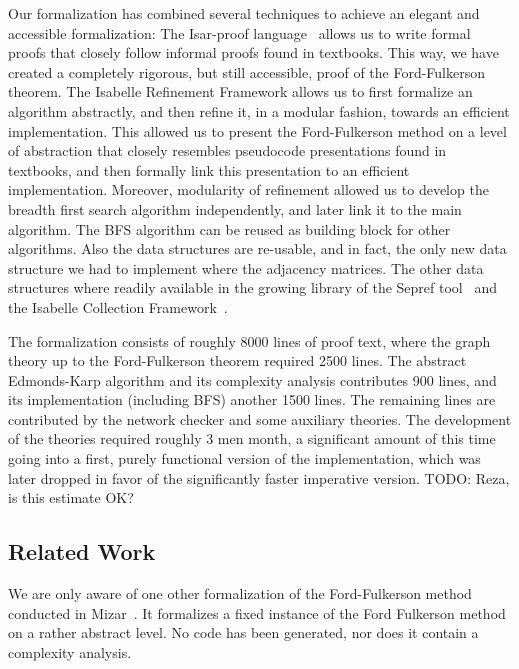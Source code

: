 \documentclass{llncs}
\begin{document}
  Our formalization has combined several techniques to achieve an elegant and accessible formalization: The Isar-proof language~\cite{}
  allows us to write formal proofs that closely follow informal proofs found in textbooks. This way, we have created a completely rigorous, but 
  still accessible, proof of the Ford-Fulkerson theorem. The Isabelle Refinement Framework allows us to first formalize an algorithm abstractly, 
  and then refine it, in a modular fashion, towards an efficient implementation. This allowed us to present the Ford-Fulkerson method on a level 
  of abstraction that closely resembles pseudocode presentations found in textbooks, and then formally link this presentation to an efficient
  implementation. Moreover, modularity of refinement allowed us to develop the breadth first search algorithm independently, and later link it to the 
  main algorithm. The BFS algorithm can be reused as building block for other algorithms. Also the data structures are re-usable, and in fact, the 
  only new data structure we had to implement where the adjacency matrices. The other data structures where readily available in the growing library 
  of the Sepref tool~\cite{La15} and the Isabelle Collection Framework~\cite{LaTu12}.

  The formalization consists of roughly 8000 lines of proof text, where the graph theory up to the Ford-Fulkerson theorem required 2500 lines.
  The abstract Edmonds-Karp algorithm and its complexity analysis contributes 900 lines, and its implementation (including BFS) another 1500 lines.
  The remaining lines are contributed by the network checker and some auxiliary theories. The development of the theories required roughly 3 men month, a significant amount of this time going into a first, purely functional version of the implementation, which was later dropped in favor of the significantly faster imperative version.
  TODO: Reza, is this estimate OK?
  
  
  \subsection{Related Work}
  We are only aware of one other formalization of the Ford-Fulkerson method conducted in Mizar~\cite{}. 
  It formalizes a fixed instance of the Ford Fulkerson method on a rather abstract level. No code has been generated, 
  nor does it contain a complexity analysis.
  
\end{document}
